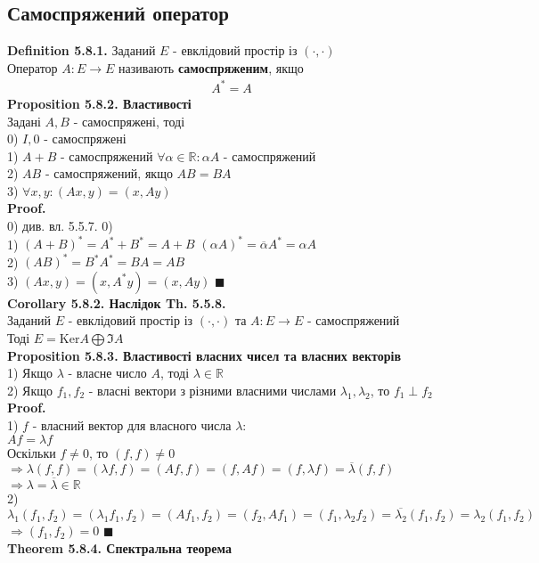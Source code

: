 \documentclass[a4paper, 14pt]{extarticle}
\def\defin#1{\textbf{Definition {#1}}}
\def\prp#1{\textbf{Proposition {#1}}}
\def\th#1{\textbf{Theorem {#1}}}
\def\crl#1{\textbf{Corollary {#1}}}
\def\proof{\textbf{Proof.}\\}
\def\bigline{\vspace{5mm}\\}
\def\qed{$\blacksquare$}
\def\ker#1{\textrm{Ker} {#1}}
\begin{document}
\subsection{Самоспряжений оператор}
\defin{5.8.1.} Заданий $E$ - евклідовий простір із $(\cdot, \cdot)$\\
Оператор $A: E \to E$ називають \textbf{самоспряженим}, якщо
\begin{align*}
A^* = A
\end{align*}
\prp{5.8.2. Властивості}\\
Задані $A,B$ - самоспряжені, тоді\\
0) $I,0$ - самоспряжені\\
1) $A+B$ - самоспряжений \hspace{1cm} $\forall \alpha \in \mathbb{R}: \alpha A$ - самоспряжений\\
2) $AB$ - самоспряжений, якщо $AB = BA$\\
3) $\forall x,y: (Ax,y) = (x,Ay)$\\
\proof
0) див. вл. 5.5.7. 0)
\bigline
1) $(A+B)^* = A^* + B^* = A + B$ \hspace{1cm} $(\alpha A)^* = \overline{\alpha} A^* = \alpha A$
\bigline
2) $(AB)^* = B^* A^* = BA = AB$
\bigline
3) $(Ax,y) = (x,A^*y) = (x, Ay)$ \qed
\bigline
\crl{5.8.2. Наслідок Th. 5.5.8.}\\
Заданий $E$ - евклідовий простір із $(\cdot, \cdot)$ та $A: E \to E$ - самоспряжений\\
Тоді $E = \ker A \bigoplus \Im A$
\bigline
\prp{5.8.3. Властивості власних чисел та власних векторів}\\
1) Якщо $\lambda$ - власне число $A$, тоді $\lambda \in \mathbb{R}$\\
2) Якщо $f_1,f_2$ - власні вектори з різними власними числами $\lambda_1, \lambda_2$, то $f_1 \perp f_2$\\
\proof
1) $f$ - власний вектор для власного числа $\lambda$:\\
$Af = \lambda f$\\
Оскільки $f \neq 0$, то $(f,f) \neq 0$\\
$\Rightarrow \lambda (f,f) = (\lambda f, f) = (Af,f) = (f,Af) = (f, \lambda f) = \overline{\lambda} (f,f)$\\
$\Rightarrow \lambda = \overline{\lambda} \in \mathbb{R}$
\bigline
2) $\lambda_1 (f_1,f_2) = (\lambda_1 f_1, f_2) = (Af_1, f_2) = (f_2, Af_1) = (f_1, \lambda_2 f_2) = \overline{\lambda_2} (f_1,f_2) = \lambda_2 (f_1,f_2)$\\
$\Rightarrow (f_1,f_2) = 0$ \qed
\bigline
\th{5.8.4. Спектральна теорема}\\
\end{document}

